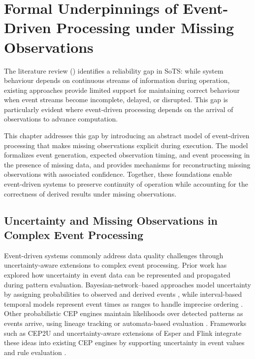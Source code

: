 \chapter{Formal Underpinnings of Event-Driven Processing under Missing Observations}
\label{ch:model}

The literature review () identifies a reliability gap in SoTS: while system behaviour depends on continuous streams of information during operation, existing approaches provide limited support for maintaining correct behaviour when event streams become incomplete, delayed, or disrupted. This gap is particularly evident where event-driven processing depends on the arrival of observations to advance computation.

This chapter addresses this gap by introducing an abstract model of event-driven processing that makes missing observations explicit during execution. The model formalizes event generation, expected observation timing, and event processing in the presence of missing data, and provides mechanisms for reconstructing missing observations with associated confidence. Together, these foundations enable event-driven systems to preserve continuity of operation while accounting for the correctness of derived results under missing observations.

\section{Uncertainty and Missing Observations in Complex Event Processing}
Event-driven systems commonly address data quality challenges through uncertainty-aware extensions to complex event processing. Prior work has explored how uncertainty in event data can be represented and propagated during pattern evaluation. Bayesian-network–based approaches model uncertainty by assigning probabilities to observed and derived events \citep{wasserkrug2010efficient, wasserkrug2012model}, while interval-based temporal models represent event times as ranges to handle imprecise ordering \citep{zhang2013recognizing}. Other probabilistic CEP engines maintain likelihoods over detected patterns as events arrive, using lineage tracking or automata-based evaluation \citep{shen2008probabilistic, kawashima2010complex, chuanfei2010complex, wang2013complex}. Frameworks such as CEP2U and uncertainty-aware extensions of Esper and Flink integrate these ideas into existing CEP engines by supporting uncertainty in event values and rule evaluation \citep{cugola2015introducing, moreno2019managing}.

